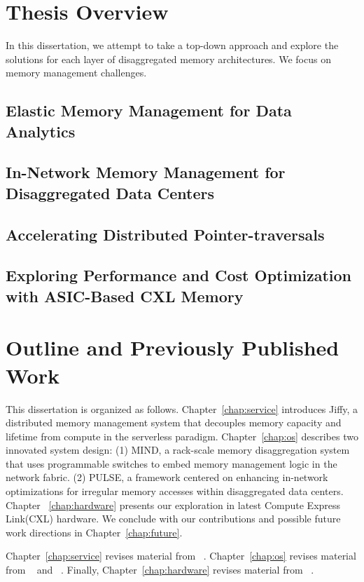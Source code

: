 \section{Thesis Overview}

In this dissertation, we attempt to take a top-down approach and explore the solutions for each layer of disaggregated memory architectures. We focus on memory management challenges.

\subsection{Elastic Memory Management for Data Analytics}
\subsection{In-Network Memory Management for Disaggregated Data Centers}
\subsection{Accelerating Distributed Pointer-traversals}
\subsection{Exploring Performance and Cost Optimization with ASIC-Based CXL Memory}

\section{Outline and Previously Published Work}

This dissertation is organized as follows. Chapter~\ref{chap:service} introduces Jiffy, a distributed memory management system that decouples memory capacity and lifetime from compute in the serverless paradigm. Chapter~\ref{chap:os} describes two innovated system design: (1) MIND, a rack-scale memory disaggregation system that uses programmable switches to embed memory management logic in
the network fabric. (2) PULSE, a framework centered on enhancing in-network optimizations for
irregular memory accesses within disaggregated data centers. Chapter ~\ref{chap:hardware} presents our exploration in latest Compute Express Link(CXL) hardware. We conclude with our contributions and possible future work directions in Chapter~\ref{chap:future}.

Chapter~\ref{chap:service} revises material from ~\cite{jiffy}. Chapter~\ref{chap:os} revises material from ~\cite{mind} and ~\cite{chase}. Finally, Chapter~\ref{chap:hardware} revises material from ~\cite{cxleurosys}.
